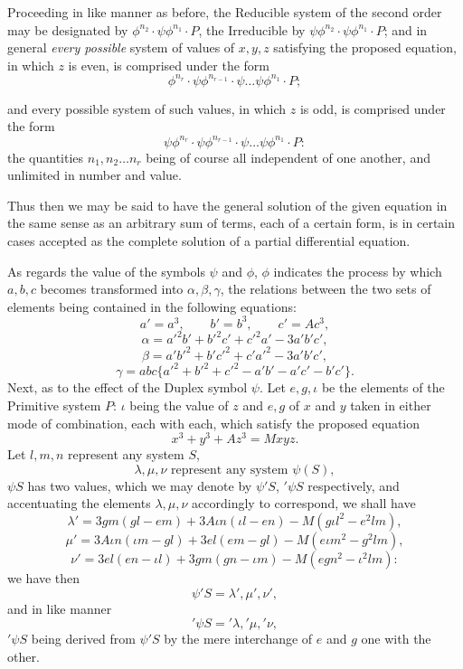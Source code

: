 \documentclass[11pt]{article}
\newcommand{\sourcepage}[1]{\marginpar{\scriptsize p.~#1}}
\begin{document}
{{Proceeding in like manner as before, the Reducible system of the second order may be designated by $\phi^{n_2}\cdot\psi\phi^{n_1}\cdot P$, the Irreducible by $\psi\phi^{n_2}\cdot\psi\phi^{n_1}\cdot P$; and in general \emph{every possible} system of values of $x,y,z$ satisfying the proposed equation, in which $z$ is even, is comprised under the form
\[
\phi^{n_r}\cdot\psi\phi^{n_{r-1}}\cdot\psi\ldots\psi\phi^{n_1}\cdot P;
\]

\sourcepage{116}
and every possible system of such values, in which $z$ is odd, is comprised under the form
\[
\psi\phi^{n_r}\cdot\psi\phi^{n_{r-1}}\cdot\psi\ldots\psi\phi^{n_1}\cdot P:
\]
the quantities $n_1,n_2\ldots n_r$ being of course all independent of one another, and unlimited in number and value.

Thus then we may be said to have the general solution of the given equation in the same sense as an arbitrary sum of terms, each of a certain form, is in certain cases accepted as the complete solution of a partial differential equation.

As regards the value of the symbols $\psi$ and $\phi$, $\phi$ indicates the process by which $a,b,c$ becomes transformed into $\alpha,\beta,\gamma$, the relations between the two sets of elements being contained in the following equations:
\[
a'=a^3,\qquad b'=b^3,\qquad c'=Ac^3,
\]
\[
\alpha=a'^2b'+b'^2c'+c'^2a'-3a'b'c',
\]
\[
\beta=a'b'^2+b'c'^2+c'a'^2-3a'b'c',
\]
\[
\gamma=abc\{a'^2+b'^2+c'^2-a'b'-a'c'-b'c'\}.
\]
Next, as to the effect of the Duplex symbol $\psi$. Let $e,g,\iota$ be the elements of the Primitive system $P$: $\iota$ being the value of $z$ and $e,g$ of $x$ and $y$ taken in either mode of combination, each with each, which satisfy the proposed equation
\[
x^3+y^3+Az^3=Mxyz.
\]
Let $l,m,n$ represent any system $S$,
\[
\lambda,\mu,\nu\text{ represent any system }\psi(S),
\]
$\psi S$ has two values, which we may denote by $\psi'S$, ${}'\!\psi S$ respectively, and accentuating the elements $\lambda,\mu,\nu$ accordingly to correspond, we shall have
\[
\lambda'=3gm(gl-em)+3A\iota n(\iota l-en)-M(g\iota l^2-e^2lm),
\]
\[
\mu'=3A\iota n(\iota m-gl)+3el(em-gl)-M(e\iota m^2-g^2lm),
\]
\[
\nu'=3el(en-\iota l)+3gm(gn-\iota m)-M(egn^2-\iota^2lm):
\]
we have then
\[
\psi'S=\lambda',\mu',\nu',
\]
and in like manner
\[
{}'\!\psi S={} '\!\lambda,{} '\!\mu,{} '\!\nu,
\]
${}'\!\psi S$ being derived from $\psi'S$ by the mere interchange of $e$ and $g$ one with the other.

}}
\end{document}
